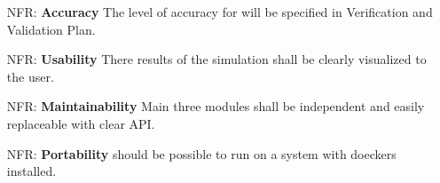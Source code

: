 \documentclass[12pt]{article}
\newcounter{nfrnum} %
\begin{document}
\noindent \begin{itemize}

\item[NFR\refstepcounter{nfrnum}\thenfrnum \label{NFR_Accuracy}:] 
\textbf{Accuracy} The level of accuracy for \progname{} will 
be specified in Verification and Validation Plan.

\item[NFR\refstepcounter{nfrnum}\thenfrnum \label{NFR_Usability}:] \textbf{Usability}
  There results of the simulation shall be clearly visualized to the user.

\item[NFR\refstepcounter{nfrnum}\thenfrnum \label{NFR_Maintainability}:]
  \textbf{Maintainability}
  Main three modules shall be independent and easily replaceable with clear API.

\item[NFR\refstepcounter{nfrnum}\thenfrnum \label{NFR_Portability}:]
  \textbf{Portability}
  \progname should be possible to run on a system with doeckers installed.


\end{itemize}
\end{document}
